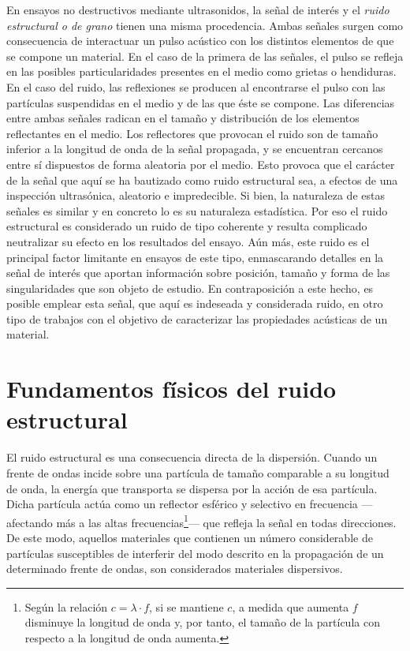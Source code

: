 En ensayos no destructivos mediante ultrasonidos, la señal de interés y el
\emph{ruido estructural o de grano} tienen una misma procedencia. Ambas
señales surgen como consecuencia de interactuar un pulso acústico con los
distintos elementos de que se compone un material. En el caso de la primera
de las señales, el pulso se refleja en las posibles particularidades
presentes en el medio como grietas o hendiduras. En el caso del ruido, las
reflexiones se producen al encontrarse el pulso con las partículas
suspendidas en el medio y de las que éste se compone. Las diferencias entre
ambas señales radican en el tamaño y distribución de los elementos
reflectantes en el medio. Los reflectores que provocan el ruido son de
tamaño inferior a la longitud de onda de la señal propagada, y se
encuentran cercanos entre sí dispuestos de forma aleatoria por el medio.
Esto provoca que el carácter de la señal que aquí se ha bautizado como
ruido estructural sea, a efectos de una inspección ultrasónica, aleatorio e
impredecible. Si bien, la naturaleza de estas señales es similar y en
concreto lo es su naturaleza estadística. Por eso el ruido estructural es
considerado un ruido de tipo coherente y resulta complicado neutralizar su
efecto en los resultados del ensayo. Aún más, este ruido es el principal
factor limitante en ensayos de este tipo, enmascarando detalles en la señal
de interés que aportan información sobre posición, tamaño y forma de las
singularidades que son objeto de estudio. En contraposición a este hecho,
es posible emplear esta señal, que aquí es indeseada y considerada ruido,
en otro tipo de trabajos con el objetivo de caracterizar las propiedades
acústicas de un material.


\section{Fundamentos físicos del ruido estructural}

El ruido estructural es una consecuencia directa de la dispersión. Cuando
un frente de ondas incide sobre una partícula de tamaño comparable a su
longitud de onda, la energía que transporta se dispersa por la acción de
esa partícula. Dicha partícula actúa como un reflector esférico y selectivo
en frecuencia ---afectando más a las altas frecuencias\footnote{Según la
relación $c = \lambda\cdot f$, si se mantiene $c$, a medida que aumenta $f$
disminuye la longitud de onda y, por tanto, el tamaño de la partícula con
respecto a la longitud de onda aumenta.}--- que refleja la señal en todas
direcciones. De este modo, aquellos materiales que contienen un número
considerable de partículas susceptibles de interferir del modo descrito en
la propagación de un determinado frente de ondas, son considerados
materiales dispersivos.

